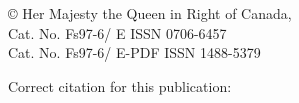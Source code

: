 \vspace*{\fill}
\begin{center}
\begin{minipage}{\widthof{\copyright{} Her Majesty the Queen in Right of Canada, \trYear{}}}
\copyright{} Her Majesty the Queen in Right of Canada, \trYear{}\\
Cat. No. Fs97-6/\trReportNum{} E \hfill ISSN 0706-6457\\
Cat. No. Fs97-6/\trReportNum{} E-PDF \hfill ISSN 1488-5379
\end{minipage}
\end{center}
\par
\bigskip
\noindent
Correct citation for this publication:
\bigskip
\par
\trCitation{}
\clearpage
